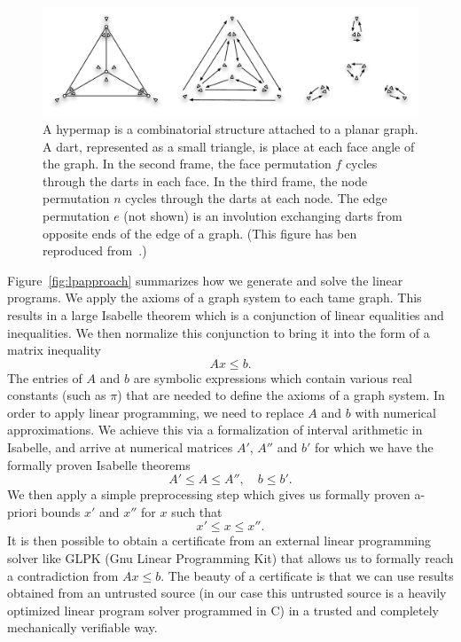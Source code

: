 \documentclass[11pt]{amsart}
\begin{document}
\begin{figure}
\begin{center}
\includegraphics[width=12cm]{hyper.pdf}
\end{center}
\caption{A hypermap is a combinatorial structure attached to a planar graph.  A  dart, represented as a small triangle, is place at each face angle of the graph.  In the second frame, the face permutation $f$ cycles through the darts in each face.  In the third frame, the node permutation $n$ cycles through the darts at each node.  The edge permutation $e$ (not shown) is an involution exchanging darts from opposite ends of the edge of a graph. (This figure has ben reproduced from~\cite{Hales:2008:Dodec}.)}
\label{fig:hypermap}
\end{figure}

Figure~\ref{fig:lpapproach} summarizes how we generate and solve the linear programs.
We apply the axioms of a graph system to each tame graph. This results in a large Isabelle theorem which is a conjunction of
linear equalities and inequalities. We then normalize this conjunction
to bring it into the form of a matrix inequality
\begin{equation}
A  x \leq b.
\end{equation}
The entries of $A$ and $b$ are symbolic expressions which contain various real constants (such as $\pi$) that are needed to
define the axioms of a graph system. In order to apply linear programming, 
we need to replace $A$ and $b$ with numerical approximations. We achieve this via a formalization of 
interval arithmetic in Isabelle, and arrive at numerical matrices $A'$, $A''$ and $b'$ for which we have the formally proven 
Isabelle theorems 
\begin{equation}
A' \leq  A  \leq A'', \quad b \leq b'.
\end{equation}
We then apply a simple preprocessing step which gives us formally proven a-priori bounds $x'$ and $x''$ for $x$ such
that 
\begin{equation}
x' \leq x \leq x''.
\end{equation}
It is then possible to obtain a certificate from an external linear programming solver like GLPK (Gnu Linear Programming Kit) that allows us to formally reach a contradiction from $A x \leq b$. The beauty of a certificate is 
that we can use results obtained from an untrusted source (in our case this untrusted source is a 
heavily optimized linear program solver programmed in C) in a trusted and completely mechanically verifiable way.
\end{document}
